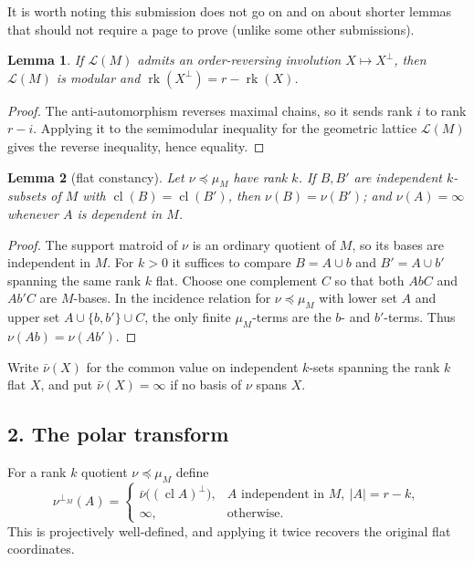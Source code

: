 \documentclass[12pt]{article}
\newcommand{\cL}{\mathcal L}
\newcommand{\rk}{\operatorname{rk}}
\newcommand{\cl}{\operatorname{cl}}
\newtheorem{lemma}{Lemma}
\newcommand{\review}[1]{\begin{reviewbox}#1\end{reviewbox}}
\begin{document}
\review{It is worth noting this submission does not go on and on about shorter lemmas that should not require a page to prove (unlike some other submissions).}

\begin{lemma}\label{lem:modular}
If $\cL(M)$ admits an order-reversing involution $X\mapsto X^\perp$,
then $\cL(M)$ is modular and $\rk(X^\perp)=r-\rk(X)$.
\end{lemma}

\begin{proof}
The anti-automorphism reverses maximal chains, so it sends rank $i$ to
rank $r-i$.  Applying it to the semimodular inequality for the geometric
lattice $\cL(M)$ gives the reverse inequality, hence equality.
\end{proof}

\begin{lemma}[flat constancy]\label{lem:flatconst}
Let $\nu\preceq\mu_M$ have rank $k$.  If $B,B'$ are independent
$k$-subsets of $M$ with $\cl(B)=\cl(B')$, then $\nu(B)=\nu(B')$; and
$\nu(A)=\infty$ whenever $A$ is dependent in $M$.
\end{lemma}

\begin{proof}
The support matroid of $\nu$ is an ordinary quotient of $M$, so its
bases are independent in $M$.  For $k>0$ it suffices to compare
$B=A\cup b$ and $B'=A\cup b'$ spanning the same rank $k$ flat.  Choose
one complement $C$ so that both $AbC$ and $Ab'C$ are $M$-bases.  In the
incidence relation for $\nu\preceq\mu_M$ with lower set $A$ and upper
set $A\cup\{b,b'\}\cup C$, the only finite $\mu_M$-terms are the
$b$- and $b'$-terms.  Thus $\nu(Ab)=\nu(Ab')$.
\end{proof}

Write $\bar\nu(X)$ for the common value on independent $k$-sets spanning
the rank $k$ flat $X$, and put $\bar\nu(X)=\infty$ if no basis of $\nu$
spans $X$.

\subsection*{2. The polar transform}

For a rank $k$ quotient $\nu\preceq\mu_M$ define
\[
 \nu^{\perp_M}(A)=
 \begin{cases}
   \bar\nu\bigl((\cl A)^\perp\bigr),
      & A\text{ independent in }M,\ |A|=r-k,\\
   \infty,&\text{otherwise.}
 \end{cases}                                                 \tag{2}
\]
This is projectively well-defined, and applying it twice recovers the
original flat coordinates.
\end{document}
